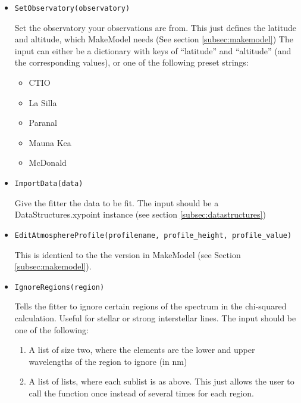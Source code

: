 \documentclass{article}
\begin{document}
\begin{itemize}
  \item \begin{Verbatim}[commandchars=\\\{\}]
SetObservatory(observatory)
    \end{Verbatim}
    Set the observatory your observations are from. This just defines the latitude and altitude, which MakeModel needs (See section \ref{subsec:makemodel})
    The input can either be a dictionary with keys of ``latitude'' and ``altitude'' (and the corresponding values), or one of the following preset strings:
    \begin{itemize}
      \item CTIO
      \item La Silla
      \item Paranal
      \item Mauna Kea
      \item McDonald
    \end{itemize}
    
  \item \begin{Verbatim}[commandchars=\\\{\}]
ImportData(data)
    \end{Verbatim}
    Give the fitter the data to be fit. The input should be a DataStructures.xypoint instance (see section \ref{subsec:datastructures})
  
  \item \begin{Verbatim}[commandchars=\\\{\}]
EditAtmosphereProfile(profilename, profile_height, profile_value)
    \end{Verbatim}
    This is identical to the the version in MakeModel (see Section \ref{subsec:makemodel}).
    
  \item \begin{Verbatim}[commandchars=\\\{\}]
IgnoreRegions(region)
    \end{Verbatim}
    Tells the fitter to ignore certain regions of the spectrum in the chi-squared calculation. Useful for stellar or strong interstellar lines. The input should be one of the following:
    \begin{enumerate}
    \item A list of size two, where the elements are the lower and upper wavelengths of the region to ignore (in nm)
    \item A list of lists, where each sublist is as above. This just allows the user to call the function once instead of several times for each region.
    \end{enumerate}
    

\end{itemize}
\end{document}
